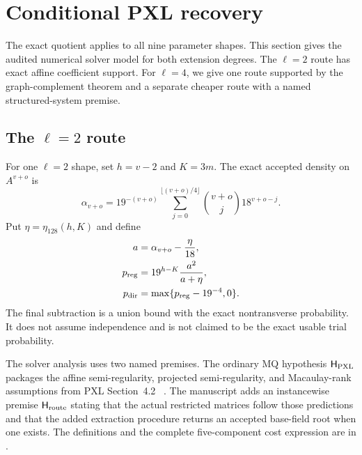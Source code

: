 \documentclass[11pt]{article}
\begin{document}
\section{Conditional PXL recovery}
\label{sec:pxl-l2-recovery}

The exact quotient applies to all nine parameter shapes.  This section gives
the audited numerical solver model for both extension degrees.  The
$\ell=2$ route has exact affine coefficient support.  For $\ell=4$, we give
one route supported by the graph-complement theorem and a separate cheaper
route with a named structured-system premise.

\subsection{The \texorpdfstring{$\ell=2$}{ell=2} route}

For one $\ell=2$ shape, set $h=v-2$ and $K=3m$.  The exact accepted density
on $A^{v+o}$ is
\begin{equation}
 \alpha_{v+o}=19^{-(v+o)}
 \sum_{j=0}^{\lfloor(v+o)/4\rfloor}
 \binom{v+o}{j}18^{v+o-j}.                          \label{eq:pxl-alpha}
\end{equation}
Put $\eta=\eta_{128}(h,K)$ and define
\begin{align}
 a&=\alpha_{v+o}-\frac{\eta}{18},\notag\\
 p_{\rm reg}&=19^{h-K}\frac{a^2}{a+\eta},\notag\\
 p_{\rm dir}&=\max\{p_{\rm reg}-19^{-4},0\}.       \label{eq:pxl-pdir}
\end{align}
The final subtraction is a union bound with the exact nontransverse
probability.  It does not assume independence and is not claimed to be the
exact usable trial probability.

The solver analysis uses two named premises.  The ordinary MQ hypothesis
$\mathsf H_{\rm PXL}$ packages the affine semi-regularity, projected
semi-regularity, and Macaulay-rank assumptions from PXL Section~4.2
~\cite{FurueKudo2024PXL}.  The manuscript adds an instancewise premise
$\mathsf H_{\rm route}$ stating that the actual restricted matrices follow
those predictions and that the added extraction procedure returns an
accepted base-field root when one exists.  The definitions and the complete
five-component cost expression are in .
\end{document}
